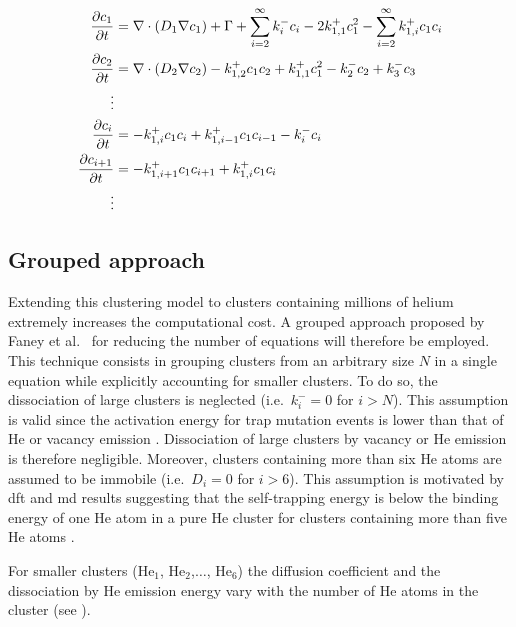 \begin{subequations}
    \begin{align}
        \frac{\partial c_1}{\partial t} &= \nabla \cdot (D_1 \nabla c_1) + \Gamma + \sum\limits_{i=2}^\infty k_{i}^- c_i - 2k_{1, 1}^+ c_1^2 - \sum\limits_{i=2}^\infty k_{1,i}^+ c_1 c_i \\
        \frac{\partial c_2}{\partial t} &= \nabla \cdot (D_2 \nabla c_2) - k_{1, 2}^+ c_1 c_2 + k_{1, 1}^+ c_1^2 - k_{2}^- c_2 + k_{3}^- c_3\\
        \vdots \nonumber\\
        \frac{\partial c_i}{\partial t} &= - k_{1, i}^+ c_1 c_i + k_{1, i-1}^+ c_1 c_{i-1} - k_{i}^- c_i\\
        \frac{\partial c_{i+1}}{\partial t} &= - k_{1, i+1}^+ c_1 c_{i+1} + k_{1, i}^+ c_1 c_i\\
        \vdots \nonumber
    \end{align}
    \labeq{temporal evolution no grouping}
\end{subequations}

\subsection{Grouped approach}
Extending this clustering model to clusters containing millions of helium extremely increases the computational cost.
A grouped approach proposed by Faney et al.\  for reducing the number of equations will therefore be employed.
This technique consists in grouping clusters from an arbitrary size $N$ in a single equation while explicitly accounting for smaller clusters.
To do so, the dissociation of large clusters is neglected (i.e.\ $k_i^- = 0$ for $i>N$).
This assumption is valid since the activation energy for \gls{trap mutation} events is lower than that of He or \gls{vacancy} emission .
Dissociation of large clusters by \gls{vacancy} or He emission is therefore negligible.
Moreover, clusters containing more than six \gls{He} atoms are assumed to be immobile (i.e.\ $D_i = 0$ for $i>6$).
This assumption is motivated by \gls{dft} and \gls{md} results suggesting that the \gls{self-trapping} energy is below the binding energy of one He atom in a pure He cluster for clusters containing more than five He atoms \cite{boisse_modeling_2014}.

For smaller clusters ($\mathrm{He}_1$, $\mathrm{He}_2$,$\ldots$, $\mathrm{He}_6$) the diffusion coefficient and the dissociation by He emission energy vary with the number of \gls{He} atoms in the cluster (see ).

